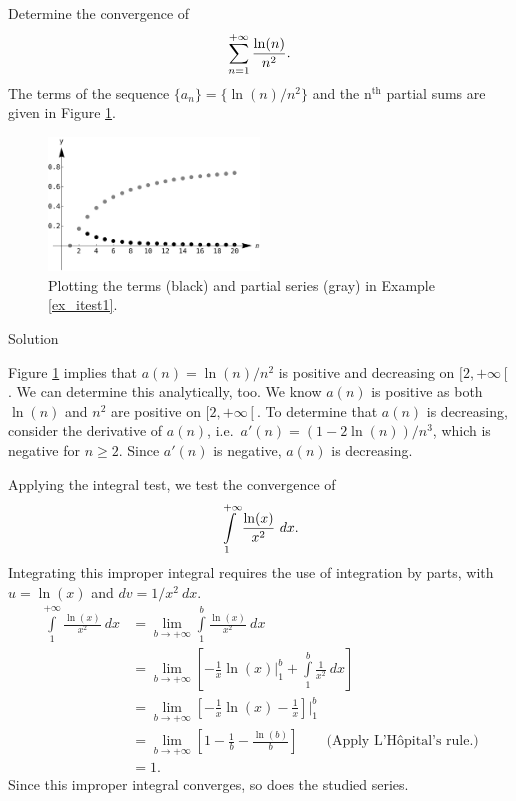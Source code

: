 \begin{example}\label{ex_itest1}
Determine the convergence of 
$$\displaystyle\sum_{n=1}^{+\infty} \frac{\ln(n)}{n^2}.$$
The terms of the sequence $\{a_n\} = \{\ln(n)/n^2\}$ and the n$^{\text{th}}$ partial sums are given in Figure \ref{fig_series_11}.

\begin{figure}[H]
	\begin{center}
			\includegraphics[width=0.5\textwidth]{fig_series_11}
	\caption{Plotting the terms (black) and partial series (gray) in Example \ref{ex_itest1}.}
	\label{fig_series_11}
	\end{center}
\end{figure}


Solution 

Figure \ref{fig_series_11} implies that $a(n) = \ln(n)/n^2$ is positive and decreasing on $[2,+\infty\left[\right.$. We can determine this analytically, too. We know $a(n)$ is positive as both $\ln (n)$ and $n^2$ are positive on $[2,+\infty\left[\right.$. To determine that $a(n)$ is decreasing, consider the derivative of $a(n)$, i.e.\ $a'(n) = (1-2\ln(n))/n^3$, which is negative for $n\geq 2$. Since $a'(n)$ is negative, $a(n)$ is decreasing.


Applying the integral test, we test the convergence of $$\ds \int\limits_1^{+\infty} \frac{\ln(x)}{x^2}\ dx.$$ Integrating this improper integral requires the use of integration by parts, with $u = \ln(x)$ and $dv = 1/x^2\ dx$. 
\allowdisplaybreaks
\begin{align*}
\int\limits_1^{+\infty} \frac{\ln(x)}{x^2}\ dx &= \lim_{b\to+\infty} \int\limits_1^b \frac{\ln(x)}{x^2}\ dx\\[0.2cm]
				&= \lim_{b\to+\infty} \left[ -\frac1x\ln(x)\Bigg|_1^b + \int\limits_1^b\frac1{x^2}\ dx \right] \\[0.2cm]
				&= \lim_{b\to+\infty} \left[-\frac1x\ln(x) -\frac 1x \right]\Bigg|_1^b\\[0.2cm]
				&= \lim_{b\to+\infty}\left[1-\frac1b-\frac{\ln(b)}{b}\right]\qquad \text{(Apply L'H\^opital's rule.)}\\
				&= 1.
\end{align*}
Since this improper integral converges, so does the studied series.
\end{example}

